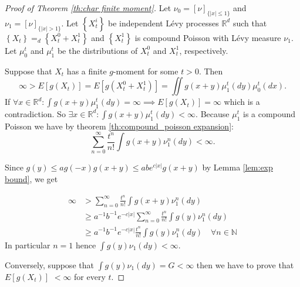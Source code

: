 \documentclass[a4paper,11pt]{article}
\begin{document}
\begin{proof}[Proof of Theorem \ref{th:char finite moment}]

    Let $\nu_{0}=[\nu]_{\{|x| \leq 1\}}$ and $\nu_{1}=[\nu]_{\{|x|>1\}}$. Let
    $\left\{X_{t}^{i}\right\}$ be independent Lévy processes  $\mathbb{R}^{d}$ such
    that $\left\{X_{t}\right\} =_{d} \left\{X_{t}^{0}+ X_{t}^{1}\right\}$ and
    $\left\{X_{t}^{1}\right\}$ is compound Poisson with Lévy measure $\nu_{1}$. Let $\mu_{0}^{t}$ and $\mu_{1}^{t}$ be
    the distributions of $X_{t}^{0}$ and $X_{t}^{1}$, respectively.

    Suppose that $X_{t}$ has a finite $g$-moment for some $t>0$. Then
    \begin{equation}
        \infty > E\left[g\left(X_{t}\right)\right]
        = E\left[g\left(X^{0}_{t} + X^{1}_{t}\right)\right]
        = \iint g(x+y) \mu_{1}^{t}(dy) \mu_{0}^{t}(dx) .
    \end{equation}
    If $\forall x \in \mathbb{R}^{d}:\int g(x+y) \mu_{1}^{t}(dy)=\infty \implies E[g(X_{t})] = \infty$ which is a contradiction. So $\exists x \in \mathbb{R}^{d}:\int g(x+y) \mu_{1}^{t}(dy)<\infty$.
    Because $\mu_{1}^{t}$ is a compound Poisson we have by theorem \ref{th:compound_poisson expansion}:
    \begin{equation}
        \sum_{n=0}^{\infty} \frac{t^{n}}{n !} \int g(x+y) \nu_{1}^{n}(dy)<\infty.
    \end{equation}

    Since $g(y) \leq a g(-x) g(x+y) \leq a b e^{c|x|} g(x+y)$ by Lemma \ref{lem:exp bound}, we get

    \begin{align}
        \infty & > \sum_{n=0}^{\infty} \frac{t^{n}}{n !} \int g(x+y) \nu_{1}^{n}(dy)                                     \\
               & \ge a^{-1} b^{-1} e^{-c|x|} \sum_{n=0}^{\infty} \frac{t^{n}}{n !} \int g(y) \nu_{1}^{n}(dy)             \\
               & \ge a^{-1} b^{-1} e^{-c|x|} \frac{t^{n}}{n !} \int g(y) \nu_{1}^{n}(dy)  \quad \forall n \in \mathbb{N}
    \end{align}
    In particular $n=1$ hence $\int g(y) \nu_{1}(d y)<\infty$.

    Conversely, suppose that $\int g(y) \nu_{1}(dy) = G<\infty$ then we have to prove
    that $E\left[g\left(X_{t}\right)\right]$ $<\infty$ for every $t$.


\end{proof}
\end{document}
